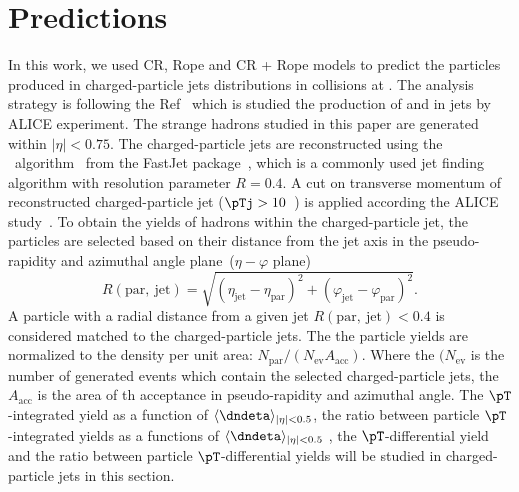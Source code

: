 \documentclass[ALICE,manyauthors]{StrinJet}
\begin{document}
\clearpage
\section{Predictions}
\label{sec:predic}
In this work, we used CR, Rope and CR + Rope models to predict the particles produced in charged-particle jets distributions in \pp collisions at \seven. The analysis strategy is following the Ref~\cite{ALICE:2021cvd} which is studied the production of \kzero and \lmb in jets by ALICE experiment. The strange hadrons studied in this paper are generated within $|\eta| < 0.75$. The charged-particle jets are reconstructed using the \akT\ algorithm~\cite{Cacciari:2008gp} from the FastJet package~\cite{Cacciari:2011ma, Cacciari:2005hq}, which is a commonly used jet finding algorithm with resolution parameter $R = 0.4$. A cut on transverse momentum of reconstructed charged-particle jet ($\pTj > 10$~\GeVc) is applied according the ALICE study~\cite{ALICE:2021cvd}. To obtain the yields of hadrons within the charged-particle jet, the particles are selected based on their distance from the jet axis in the pseudo-rapidity and azimuthal angle plane~($\eta - \varphi$ plane)
\begin{equation}
	R(\mathrm{par, ~jet}) = \sqrt{\left( \eta_\mathrm{jet} - \eta_\mathrm{par} \right)^{2} + \left( \varphi_\mathrm{jet} - \varphi_\mathrm{par} \right)^{2}}.
\end{equation}
A particle with a radial distance from a given jet $R (\mathrm{par, ~jet}) < 0.4$ is considered matched to the charged-particle jets. The the particle yields are normalized to the density per unit area: $N_\mathrm{par}/(N_\mathrm{ev}A_\mathrm{acc})$. Where the $(N_\mathrm{ev}$ is the number of generated events which contain the selected charged-particle jets, the $A_\mathrm{acc}$ is the area of th acceptance in pseudo-rapidity and azimuthal angle. The $\pT$-integrated yield as a function of $\langle\dndeta\rangle_{|\eta| < 0.5}$, the ratio between particle $\pT$-integrated yields as a functions of $\langle\dndeta\rangle_{|\eta| < 0.5}$ , the $\pT$-differential yield and the ratio between particle $\pT$-differential yields will be studied in charged-particle jets in this section.
\end{document}
